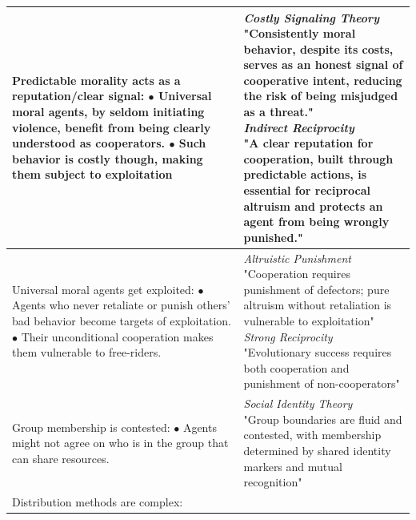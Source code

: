 \begin{table}[tbp]
\begin{tabular}{p{7cm}p{7cm}}
\hline
\parbox[t]{7cm}{Predictable morality acts as a reputation/clear signal: \\
\hspace*{1em} $\bullet$ Universal moral agents, by seldom initiating violence, benefit from being clearly understood as cooperators. \\
\hspace*{1em} $\bullet$ Such behavior is costly though, making them subject to exploitation} &
\parbox[t]{7cm}{\textit{Costly Signaling Theory} \citep{gintis2001costly} \\
"Consistently moral behavior, despite its costs, serves as an honest signal of cooperative intent, reducing the risk of being misjudged as a threat." \\
\textit{Indirect Reciprocity} \citep{nowak2005evolution} \\
"A clear reputation for cooperation, built through predictable actions, is essential for reciprocal altruism and protects an agent from being wrongly punished."} \\
\hline
\parbox[t]{7cm}{Universal moral agents get exploited: \\
\hspace*{1em} $\bullet$ Agents who never retaliate or punish others' bad behavior become targets of exploitation. \\
\hspace*{1em} $\bullet$ Their unconditional cooperation makes them vulnerable to free-riders.} & 
\parbox[t]{7cm}{\textit{Altruistic Punishment} \citep{fehr2002altruistic} \\
"Cooperation requires punishment of defectors; pure altruism without retaliation is vulnerable to exploitation" \\
\textit{Strong Reciprocity} \citep{bowles2004evolution} \\
"Evolutionary success requires both cooperation and punishment of non-cooperators"} \\
\hline
\parbox[t]{7cm}{Group membership is contested: \\
\hspace*{1em} $\bullet$ Agents might not agree on who is in the group that can share resources.} & 
\parbox[t]{7cm}{\textit{Social Identity Theory} \citep{tajfel1979individuals} \\
"Group boundaries are fluid and contested, with membership determined by shared identity markers and mutual recognition"} \\
\hline
\parbox[t]{7cm}{Distribution methods are complex: \\
}
\end{tabular}
\end{table}
